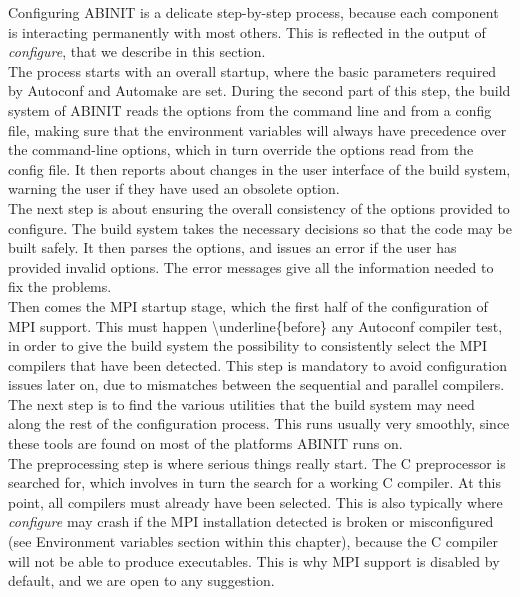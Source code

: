 Configuring ABINIT is a delicate step-by-step process, because each
component is interacting permanently with most others. This is reflected
in the output of \textit{configure}, that we describe in this section.\\


The process starts with an overall startup, where the basic parameters
required by Autoconf and Automake are set. During the second part
of this step, the build system of ABINIT reads the options from the
command line and from a config file, making sure that the environment
variables will always have precedence over the command-line options,
which in turn override the options read from the config file. It then
reports about changes in the user interface of the build system, warning
the user if they have used an obsolete option.\\


The next step is about ensuring the overall consistency of the options
provided to configure. The build system takes the necessary decisions
so that the code may be built safely. It then parses the options,
and issues an error if the user has provided invalid options. The
error messages give all the information needed to fix the problems.\\


Then comes the MPI startup stage, which the first half of the configuration
of MPI support. This must happen \textbackslash{}underline\{before\}
any Autoconf compiler test, in order to give the build system the
possibility to consistently select the MPI compilers that have been
detected. This step is mandatory to avoid configuration issues later
on, due to mismatches between the sequential and parallel compilers.\\


The next step is to find the various utilities that the build system
may need along the rest of the configuration process. This runs usually
very smoothly, since these tools are found on most of the platforms
ABINIT runs on.\\


The preprocessing step is where serious things really start. The C
preprocessor is searched for, which involves in turn the search for
a working C compiler. At this point, all compilers must already have
been selected. This is also typically where \textit{configure} may
crash if the MPI installation detected is broken or misconfigured
(see \textquotedbl{}Environment variables\textquotedbl{} section within
this chapter), because the C compiler will not be able to produce
executables. This is why MPI support is disabled by default, and we
are open to any suggestion.\\


